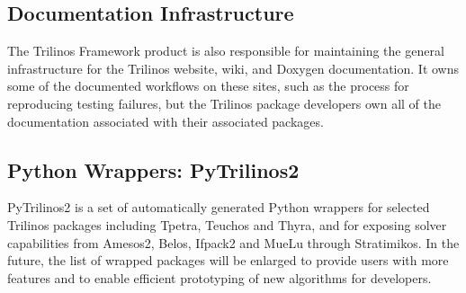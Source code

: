 \subsection{Documentation Infrastructure}

The Trilinos Framework product is also responsible for maintaining the general infrastructure for the Trilinos website, wiki, and Doxygen documentation. It owns some of the documented workflows on these sites, such as the process for reproducing testing failures, but the Trilinos package developers own all of the documentation associated with their associated packages.


\subsection{Python Wrappers: PyTrilinos2}

PyTrilinos2 is a set of automatically generated Python wrappers for selected Trilinos packages including Tpetra, Teuchos and Thyra, and for exposing solver capabilities from Amesos2, Belos, Ifpack2 and MueLu through Stratimikos. In the future, the list of wrapped packages will be enlarged to provide users with more features and to enable efficient prototyping of new algorithms for developers.

